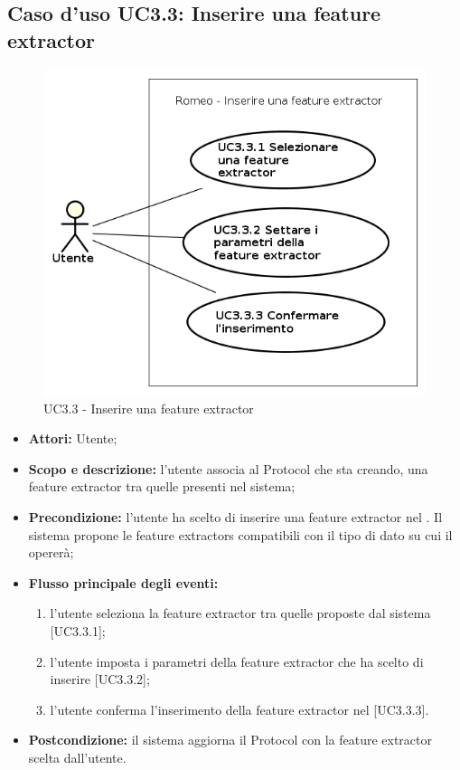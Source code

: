 \subsection{Caso d'uso UC3.3: Inserire una feature extractor}
\begin{figure}[!h]
\begin{center}
\includegraphics[scale=0.6]{./img/Use_Case/UC3_3}
\caption{UC3.3 - Inserire una feature extractor}
\end{center}
\end{figure}
\begin{itemize}
\item \textbf{Attori:} Utente;
\item \textbf{Scopo e descrizione:} l'utente associa al Protocol\glossario{} che sta creando, una feature extractor\glossario{} tra quelle presenti nel sistema;
\item \textbf{Precondizione:} l'utente ha scelto di inserire una feature extractor\glossario{} nel \protocol{}. Il sistema propone le feature extractors\glossario{} compatibili con il tipo di dato su cui il \protocol{} opererà;
\item \textbf{Flusso principale degli eventi:}
\begin{enumerate}
\item l'utente seleziona la feature extractor\glossario{} tra quelle proposte dal sistema [UC3.3.1];
\item l'utente imposta i parametri della feature extractor\glossario{} che ha scelto di inserire [UC3.3.2];
\item l'utente conferma l'inserimento della feature extractor\glossario{} nel \protocol{} [UC3.3.3].
\end{enumerate}
\item \textbf{Postcondizione:} il sistema aggiorna il Protocol\glossario{} con la feature extractor\glossario{} scelta dall'utente.
\end{itemize}

